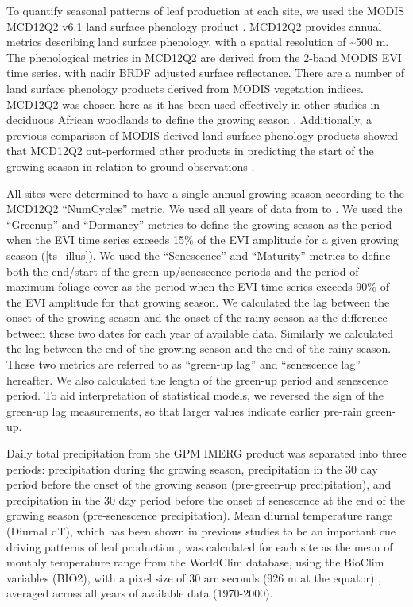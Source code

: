 \documentclass[11pt,a4paper]{article}
\begin{document}
To quantify seasonal patterns of leaf production at each site, we used the MODIS MCD12Q2 v6.1 land surface phenology product \citet{MCD12Q2}. MCD12Q2 provides annual metrics describing land surface phenology, with a spatial resolution of \textasciitilde{500 m}. The phenological metrics in MCD12Q2 are derived from the 2-band MODIS EVI time series, with nadir BRDF adjusted surface reflectance. There are a number of land surface phenology products derived from MODIS vegetation indices. MCD12Q2 was chosen here as it has been used effectively in other studies in deciduous African woodlands to define the growing season \citep{Begue2014, Adole2018b}. Additionally, a previous comparison of MODIS-derived land surface phenology products showed that MCD12Q2 out-performed other products in predicting the start of the growing season in relation to ground observations \citep{Peng2017}. 

All sites were determined to have a single annual growing season according to the MCD12Q2 ``NumCycles'' metric. We used all years of data from \modisStart{} to \modisEnd{}. We used the ``Greenup'' and ``Dormancy'' metrics to define the growing season as the period when the EVI time series exceeds 15\% of the EVI amplitude for a given growing season (\autoref{ts_illus}). We used the ``Senescence'' and ``Maturity'' metrics to define both the end/start of the green-up/senescence periods and the period of maximum foliage cover as the period when the EVI time series exceeds 90\% of the EVI amplitude for that growing season. We calculated the lag between the onset of the growing season and the onset of the rainy season as the difference between these two dates for each year of available data. Similarly we calculated the lag between the end of the growing season and the end of the rainy season. These two metrics are referred to as ``green-up lag'' and ``senescence lag'' hereafter. We also calculated the length of the green-up period and senescence period. To aid interpretation of statistical models, we reversed the sign of the green-up lag measurements, so that larger values indicate earlier pre-rain green-up.

Daily total precipitation from the GPM IMERG product was separated into three periods: precipitation during the growing season, precipitation in the 30 day period before the onset of the growing season (pre-green-up precipitation), and precipitation in the 30 day period before the onset of senescence at the end of the growing season (pre-senescence precipitation). Mean diurnal temperature range (Diurnal dT), which has been shown in previous studies to be an important cue driving patterns of leaf production \citep{Michelson2017, Escamilla2020}, was calculated for each site as the mean of monthly temperature range from the WorldClim database, using the BioClim variables (BIO2), with a pixel size of 30 arc seconds (926 m at the equator) \citep{Fick2017}, averaged across all years of available data (1970-2000).
\end{document}
